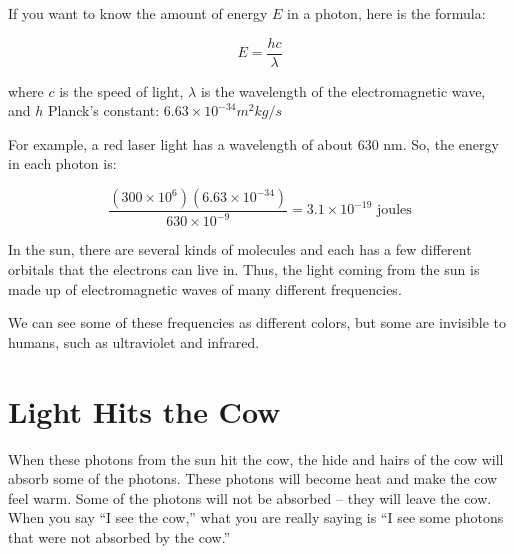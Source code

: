 \begin{mdframed}[style=important, frametitle={Formula for energy of a photon}]

If you want to know the amount of energy $E$ in a photon, here is the formula:

$$E = \frac{h c}{\lambda}$$

where $c$ is the speed of light, $\lambda$ is the wavelength of the
electromagnetic wave, and $h$ Planck's constant: $6.63 \times 10^{-34} m^2 kg/s$

For example, a red laser light has a wavelength of about 630 nm. So, the energy in each photon is:

$$\frac{(300 \times 10^6) (6.63 \times 10^{-34})}{630 \times 10^{-9}} = 3.1 \times 10^{-19} \text{ joules}$$

\end{mdframed}
In the sun, there are several kinds of molecules and each has a few
different orbitals that the electrons can live in. Thus, the light
coming from the sun is made up of electromagnetic waves of many
different frequencies.

We can see some of these frequencies as different colors, but some are
invisible to humans, such as ultraviolet and infrared.

\section{Light Hits the Cow}


When these photons from the sun hit the cow, the hide and hairs of the
cow will absorb some of the photons. These photons will become heat
and make the cow feel warm. Some of the photons will not be absorbed
-- they will leave the cow. When you say ``I see the cow,'' what you are
really saying is ``I see some photons that were not absorbed by the cow.''

